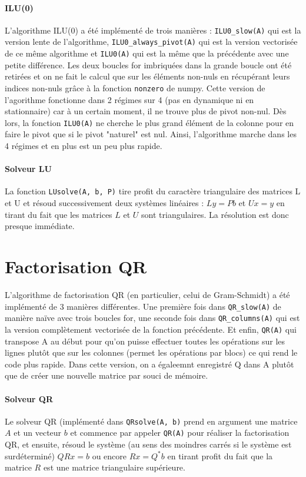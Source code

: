 \documentclass[11pt]{article}
\begin{document}
\paragraph{ILU(0)} L'algorithme ILU(0) a été implémenté de trois manières : \texttt{ILU0\_slow(A)} qui est la version lente de l'algorithme, \texttt{ILU0\_always\_pivot(A)} qui est la version vectorisée de ce même algorithme et \texttt{ILU0(A)} qui est la même que la précédente avec une petite différence. Les deux boucles for imbriquées dans la grande boucle ont été retirées et on ne fait le calcul que sur les éléments non-nuls en récupérant leurs indices non-nuls grâce à la fonction \texttt{nonzero} de numpy. Cette version de l'agorithme fonctionne dans 2 régimes sur 4 (pas en dynamique ni en stationnaire) car à un certain moment, il ne trouve plus de pivot non-nul. Dès lors, la fonction \texttt{ILU0(A)} ne cherche le plus grand élément de la colonne pour en faire le pivot que si le pivot "naturel" est nul. Ainsi, l'algorithme marche dans les 4 régimes et en plus est un peu plus rapide.
 \vspace{-5pt}
\paragraph{Solveur LU} La fonction \texttt{LUsolve(A, b, P)} tire profit du caractère triangulaire des matrices L et U et résoud successivement deux systèmes linéaires : $Ly = Pb$ et $Ux = y$ en tirant du fait que les matrices $L$ et $U$ sont triangulaires. La résolution est donc presque immédiate.
\vspace{-10pt}
\section{Factorisation QR}
\vspace{-8pt}
L'algorithme de factorisation QR (en particulier, celui de Gram-Schmidt) a été implémenté de 3 manières différentes. Une première fois dans \texttt{QR\_slow(A)} de manière naïve avec trois boucles for, une seconde fois dans \texttt{QR\_columns(A)} qui est la version complètement vectorisée de la fonction précédente. Et enfin, \texttt{QR(A)} qui transpose A au début pour qu'on puisse effectuer toutes les opérations sur les lignes plutôt que sur les colonnes (permet les opérations par blocs) ce qui rend le code plus rapide. Dans cette version, on a égaleemnt enregistré Q dans A plutôt que de créer une nouvelle matrice par souci de mémoire.
\vspace{-5pt}
\paragraph{Solveur QR} Le solveur QR (implémenté dans \texttt{QRsolve(A, b)} prend en argument une matrice $A$ et un vecteur $b$ et commence par appeler \texttt{QR(A)} pour réaliser la factorisation QR, et ensuite, résoud le système (au sens des moindres carrés si le système est surdéterminé) $QRx = b$ ou encore $Rx = Q^* b$ en tirant profit du fait que la matrice $R$ est une matrice triangulaire supérieure.
\vspace{-10pt}
\end{document}

